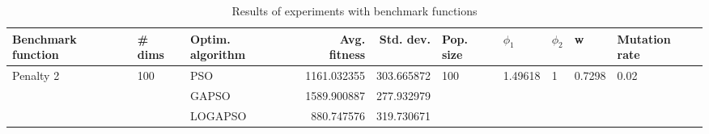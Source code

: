 \begin{table}
\centering
\caption{Results of experiments with benchmark functions}
\begin{tabular}{lllrrlllll}
\toprule
        Benchmark function &              \# dims & Optim. algorithm &  Avg. fitness &  Std. dev. &            Pop. size &               $\phi_{1}$ &         $\phi_{2}$ &                       w &         Mutation rate \\
\midrule
\multirow{3}{*}{Penalty 2} & \multirow{3}{*}{100} &              PSO &   1161.032355 & 303.665872 & \multirow{3}{*}{100} & \multirow{3}{*}{1.49618} & \multirow{3}{*}{1} & \multirow{3}{*}{0.7298} & \multirow{3}{*}{0.02} \\
                           &                      &            GAPSO &   1589.900887 & 277.932979 &                      &                          &                    &                         &                       \\
                           &                      &          LOGAPSO &    880.747576 & 319.730671 &                      &                          &                    &                         &                       \\
\bottomrule
\end{tabular}
\end{table}
